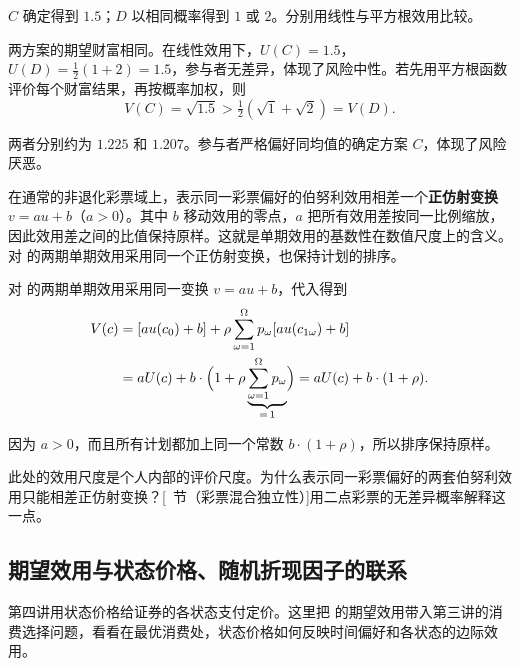 \begin{tcolorbox}[example,title=课堂例题：相同期望财富的两个选择]
\begin{question}
$C$ 确定得到 $1.5$；$D$ 以相同概率得到 $1$ 或 $2$。分别用线性与平方根效用比较。
\end{question}
\begin{solution}[blank-type=manual,blank-vsep=3\baselineskip]
两方案的期望财富相同。在线性效用下，$U(C)=1.5$，$U(D)=\tfrac12(1+2)=1.5$，参与者无差异，体现了风险中性。若先用平方根函数评价每个财富结果，再按概率加权，则
\[
 V(C)=\sqrt{1.5}>\tfrac12(\sqrt{1}+\sqrt{2})=V(D).
\]

两者分别约为 $1.225$ 和 $1.207$。参与者严格偏好同均值的确定方案 $C$，体现了风险厌恶。
\end{solution}
\end{tcolorbox}

\begin{tcolorbox}[knowledge,title=正仿射变换与基数性]
在通常的非退化彩票域上，表示同一彩票偏好的伯努利效用相差一个\textbf{正仿射变换} $v=au+b$（$a>0$）。其中 $b$ 移动效用的零点，$a$ 把所有效用差按同一比例缩放，因此效用差之间的比值保持原样。这就是单期效用的基数性在数值尺度上的含义。对 的两期单期效用采用同一个正仿射变换，也保持计划的排序。
\end{tcolorbox}

\begin{solution}[label-content={证明},blank-type=none]
对 的两期单期效用采用同一变换 $v=au+b$，代入得到
\[
 \begin{aligned}
 V(c)&=[a u(c_0)+b]+\rho\sum_{\omega=1}^{\Omega}p_\omega
       [a u(c_{1\omega})+b]\\
     &=aU(c)+b\cdot\Bigl(1+\rho\underbrace{\sum_{\omega=1}^{\Omega}p_\omega}_{=\,1}\Bigr)
       =aU(c)+b\cdot(1+\rho).
 \end{aligned}
\]

因为 $a>0$，而且所有计划都加上同一个常数 $b\cdot(1+\rho)$，所以排序保持原样。
\end{solution}

此处的效用尺度是个人内部的评价尺度。为什么表示同一彩票偏好的两套伯努利效用只能相差正仿射变换？[~节（彩票混合独立性）]用二点彩票的无差异概率解释这一点。


\subsection{期望效用与状态价格、随机折现因子的联系}
第四讲用状态价格给证券的各状态支付定价。这里把 的期望效用带入第三讲的消费选择问题，看看在最优消费处，状态价格如何反映时间偏好和各状态的边际效用。

